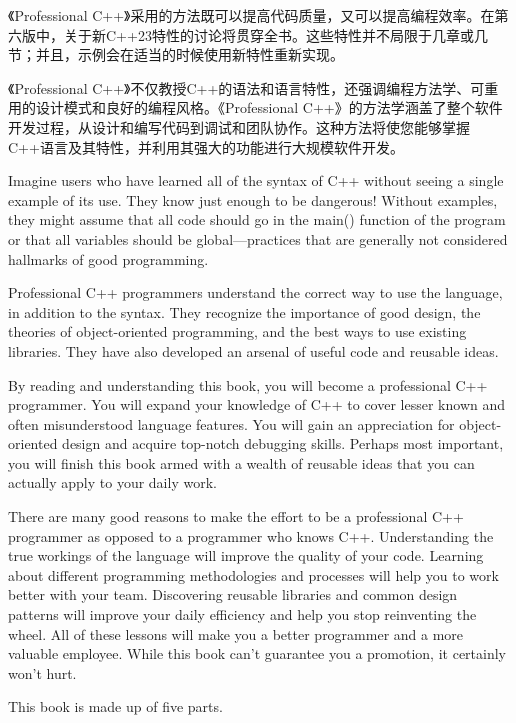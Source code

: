 
《Professional C++》采用的方法既可以提高代码质量，又可以提高编程效率。在第六版中，关于新C++23特性的讨论将贯穿全书。这些特性并不局限于几章或几节；并且，示例会在适当的时候使用新特性重新实现。

《Professional C++》不仅教授C++的语法和语言特性，还强调编程方法学、可重用的设计模式和良好的编程风格。《Professional C++》的方法学涵盖了整个软件开发过程，从设计和编写代码到调试和团队协作。这种方法将使您能够掌握C++语言及其特性，并利用其强大的功能进行大规模软件开发。

Imagine users who have learned all of the syntax of C++ without seeing a single example of its use. They know just enough to be dangerous! Without examples, they might assume that all code should go in the main() function of the program or that all variables should be global—practices that are generally not considered hallmarks of good programming.

Professional C++ programmers understand the correct way to use the language, in addition to the syntax. They recognize the importance of good design, the theories of object-oriented programming, and the best ways to use existing libraries. They have also developed an arsenal of useful code and reusable ideas.

By reading and understanding this book, you will become a professional C++ programmer. You will expand your knowledge of C++ to cover lesser known and often misunderstood language features. You will gain an appreciation for object-oriented design and acquire top-notch debugging skills. Perhaps most important, you will finish this book armed with a wealth of reusable ideas that you can actually apply to your daily work.

There are many good reasons to make the effort to be a professional C++ programmer as opposed to a programmer who knows C++. Understanding the true workings of the language will improve the quality of your code. Learning about different programming methodologies and processes will help you to work better with your team. Discovering reusable libraries and common design patterns will improve your daily efficiency and help you stop reinventing the wheel. All of these lessons will make you a better programmer and a more valuable employee. While this book can’t guarantee you a promotion, it certainly won’t hurt.


This book is made up of five parts.

